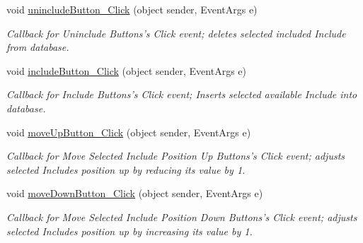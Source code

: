 \begin{DoxyCompactItemize}
void \hyperlink{class_ias_pbx_config_1_1_classes_of_service_includes_ad40df8ec47f50d714bf251013124f78e}{unincludeButton\_\-Click} (object sender, EventArgs e)
\begin{DoxyCompactList}\small\item\em Callback for Uninclude Buttons's Click event; deletes selected included Include from database. \item\end{DoxyCompactList}\item 
void \hyperlink{class_ias_pbx_config_1_1_classes_of_service_includes_a4288e7154a66a346e90956e347431c53}{includeButton\_\-Click} (object sender, EventArgs e)
\begin{DoxyCompactList}\small\item\em Callback for Include Buttons's Click event; Inserts selected available Include into database. \item\end{DoxyCompactList}\item 
void \hyperlink{class_ias_pbx_config_1_1_classes_of_service_includes_a17c623b9aeb6cc338cb883a48cd9150f}{moveUpButton\_\-Click} (object sender, EventArgs e)
\begin{DoxyCompactList}\small\item\em Callback for Move Selected Include Position Up Buttons's Click event; adjusts selected Includes position up by reducing its value by 1. \item\end{DoxyCompactList}\item 
void \hyperlink{class_ias_pbx_config_1_1_classes_of_service_includes_abb1231755250bc18b9dcaf0e9437b5b1}{moveDownButton\_\-Click} (object sender, EventArgs e)
\begin{DoxyCompactList}\small\item\em Callback for Move Selected Include Position Down Buttons's Click event; adjusts selected Includes position up by increasing its value by 1. \item\end{DoxyCompactList}\end{DoxyCompactItemize}
